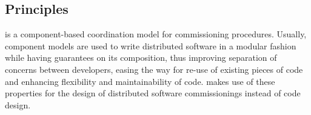
\subsection{Principles}

\mad is a component-based coordination model for commissioning
procedures. Usually, component models are used to write
distributed software in a modular fashion while having guarantees on
its composition, thus improving separation of concerns between
developers, easing the way for re-use of existing pieces of code and
enhancing flexibility and maintainability of code. \mad makes use of
these properties for the design of distributed software commissionings
instead of code design.

